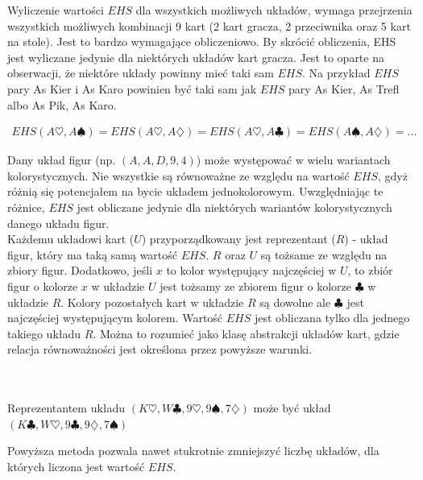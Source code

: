 \documentclass[magisterska]{pracamgr}
\newenvironment{example}[1][Przykład]{\begin{trivlist}
\item[\hskip \labelsep {\bfseries #1}]}{\end{trivlist}}
\begin{document}
\noindent
Wyliczenie wartości $EHS$ dla wszystkich możliwych układów, wymaga przejrzenia wszystkich możliwych kombinacji 9 kart (2 kart gracza, 2 przeciwnika
oraz 5 kart na stole). Jest to bardzo wymagające obliczeniowo. By skrócić obliczenia, EHS jest wyliczane jedynie dla niektórych układów
kart gracza. Jest to oparte na obserwacji, że niektóre układy powinny mieć taki sam $EHS$. Na przykład $EHS$ pary As Kier i As Karo powinien być taki
sam jak $EHS$ pary As Kier, As Trefl albo As Pik, As Karo. 

\begin{align*}
EHS(A\heartsuit, A\spadesuit) = EHS(A\heartsuit, A\diamondsuit) = EHS(A\heartsuit, A\clubsuit) = EHS(A\spadesuit, A\diamondsuit) = ...
\end{align*}

\noindent
Dany układ figur (np. $(A,A,D,9,4)$) może występować w wielu wariantach kolorystycznych. Nie wszystkie są równoważne ze względu
na wartość $EHS$, gdyż różnią się potencjałem na bycie układem jednokolorowym. Uwzględniając te różnice, $EHS$ jest obliczane jedynie
dla niektórych wariantów kolorystycznych danego układu figur. \\

\noindent
Każdemu układowi kart ($U$) przyporządkowany jest reprezentant ($R$) - układ figur, który ma taką samą wartość $EHS$.
$R$ oraz $U$ są tożsame ze względu na zbiory figur. Dodatkowo, jeśli $x$ to kolor występujący najczęściej w $U$,
to zbiór figur o kolorze $x$ w układzie $U$ jest tożsamy ze zbiorem figur o kolorze $\clubsuit$ w układzie $R$.
Kolory pozostałych kart w układzie $R$ są dowolne ale $\clubsuit$ jest najczęściej występującym kolorem. Wartość
$EHS$ jest obliczana tylko dla jednego takiego układu $R$. Można to rozumieć jako klasę abstrakcji układów kart, gdzie
relacja równoważności jest określona przez powyższe warunki. \\

\begin{example}

$\,$ \\\\
\noindent
Reprezentantem układu $(K\heartsuit, W\clubsuit, 9\heartsuit, 9\spadesuit, 7\diamondsuit)$ może być układ
$(K\clubsuit, W\heartsuit, 9\clubsuit, 9\diamondsuit, 7\spadesuit)$ \\
\end{example}

\noindent
Powyższa metoda pozwala nawet stukrotnie zmniejszyć liczbę układów, dla których liczona jest wartość $EHS$.
\end{document}
